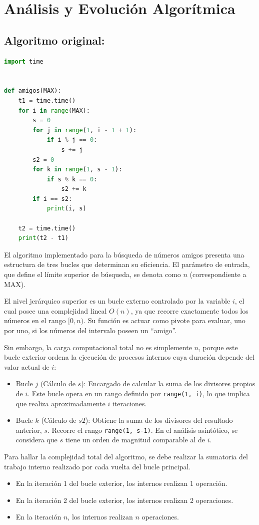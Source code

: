 \section{Análisis y Evolución Algorítmica}
\subsection{Algoritmo original:}

\begin{lstlisting}[language=Python]
import time


def amigos(MAX):
    t1 = time.time()
    for i in range(MAX):
        s = 0
        for j in range(1, i - 1 + 1):
            if i % j == 0:
                s += j
        s2 = 0
        for k in range(1, s - 1):
            if s % k == 0:
                s2 += k
        if i == s2:
            print(i, s)

    t2 = time.time()
    print(t2 - t1)
\end{lstlisting}

El algoritmo implementado para la búsqueda de números amigos presenta una estructura de tres bucles que determinan su eficiencia. El parámetro de entrada, que define el límite superior de búsqueda, se denota como $n$ (correspondiente a MAX).

El nivel jerárquico superior es un bucle externo controlado por la variable $i$, el cual posee una complejidad lineal $O(n)$, ya que recorre exactamente todos los números en el rango $[0, n)$. Su función es actuar como pivote para evaluar, uno por uno, si los números del intervalo poseen un ``amigo''.

Sin embargo, la carga computacional total no es simplemente $n$, porque este bucle exterior ordena la ejecución de procesos internos cuya duración depende del valor actual de $i$:
\begin{itemize}
	\item Bucle $j$ (Cálculo de $s$): Encargado de calcular la suma de los divisores propios de $i$. Este bucle opera en un rango definido por \texttt{range(1, i)}, lo que implica que realiza aproximadamente $i$ iteraciones.
	\item Bucle $k$ (Cálculo de $s2$): Obtiene la suma de los divisores del resultado anterior, $s$. Recorre el rango \texttt{range(1, s-1)}. En el análisis asintótico, se considera que $s$ tiene un orden de magnitud comparable al de $i$.
\end{itemize}

Para hallar la complejidad total del algoritmo, se debe realizar la sumatoria del trabajo interno realizado por cada vuelta del bucle principal.
\begin{itemize}
	\item En la iteración 1 del bucle exterior, los internos realizan 1 operación.
	\item En la iteración 2 del bucle exterior, los internos realizan 2 operaciones.
	\item En la iteración $n$, los internos realizan $n$ operaciones.
\end{itemize}

